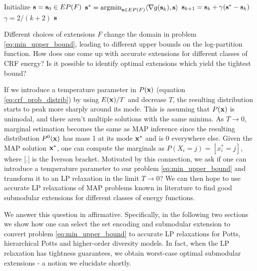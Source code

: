 \begin{algorithm}
\label{algo:fw_inference}
\begin{algorithmic}[1]
    \STATE Initialize ${\bf s} = {\bf s}_0 \in EP(F)$ \label{line:initial}
\STATE ${\bf s^*} = \operatorname*{argmin}_{{\bf s} \in EP(F)} \langle \nabla g({\bf s}_k), {\bf s} \rangle$ \label{line:cond_grad}
\ENDIF
\STATE ${\bf s}_{k + 1} = {\bf s}_k + \gamma({\bf s^*} - {\bf s}_k)$  $\gamma = 2/(k + 2)$ \label{line:step_size}
\ENDFOR   
\RETURN $\bf s$
\end{algorithmic}
\end{algorithm}


Different choices of extensions $F$ change the domain in problem \eqref{eq:min_upper_bound}, leading to different upper bounds on the log-partition function. How does one come up with accurate extensions for different classes of CRF energy? Is it possible to identify optimal extensions which yield the tightest bound? 

If we introduce a temperature parameter in $P({\bf x})$ (equation
\eqref{eq:crf_prob_distrib}) by using $E({\bf x})/T$ and decrease $T$, the
resulting distribution starts to peak more sharply around its mode. This
is assuming that $P({\bf x})$ is unimodal, and there aren't multiple solutions
with the same minima. As $T \to 0$, marginal estimation becomes the same as MAP inference since the resulting
distribution $P^0({\bf x})$ has mass 1 at its mode ${\bf x}^*$ and is
0 everywhere else. Given the MAP solution ${\bf x}^*$, one can compute the
marginals as $P(X_i = j) = [x_i^* = j]$, where [.] is the Iverson bracket. Motivated by this connection, we ask if one can introduce a temperature parameter to our problem \eqref{eq:min_upper_bound} and transform it to an LP relaxation in the limit $T \to 0$? We can then hope to use accurate LP relaxations of MAP problems known in literature to find good submodular extensions for different classes of energy functions. 

We answer this question in affirmative. Specifically, in the following two sections we show how one can select the set encoding and submodular extension to convert problem \eqref{eq:min_upper_bound} to accurate LP relaxations for Potts, hierarchical Potts and higher-order diversity models. In fact, when the LP relaxation has tightness guarantees, we obtain worst-case optimal submodular extensions - a notion we elucidate shortly. 

